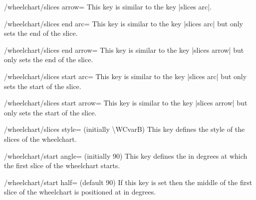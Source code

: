 \documentclass[a4paper,english,dvipsnames]{ltxdoc}
\begin{document}
\begin{key}{/wheelchart/slices arrow=}
This key is similar to the key |slices arc|.
\begin{codeexample}[width=10cm]
\begin{tikzpicture}
\wheelchart[
    gap=0.3,
    slices arrow={1}{-1}
]{\exampleforthismanual}
\end{tikzpicture}
\end{codeexample}
\end{key}
\begin{key}{/wheelchart/slices end arc=}
This key is similar to the key |slices arc| but only sets the end of the slice.
\end{key}
\begin{key}{/wheelchart/slices end arrow=}
This key is similar to the key |slices arrow| but only sets the end of the slice.
\begin{codeexample}[width=10cm]
\begin{tikzpicture}
\wheelchart[
    data={},
    explode=1,
    middle={\Large Recycle},
    slices end arrow={1}{-0.5},
    slices style=Green,
    total count=3,
    value=1
]{}
\end{tikzpicture}
\end{codeexample}
\end{key}
\begin{key}{/wheelchart/slices start arc=}
This key is similar to the key |slices arc| but only sets the start of the slice.
\end{key}
\begin{key}{/wheelchart/slices start arrow=}
This key is similar to the key |slices arrow| but only sets the start of the slice.
\end{key}
\begin{stylekey}{/wheelchart/slices style= (initially \textbackslash WCvarB)}
This key defines the style of the slices of the wheelchart.
\end{stylekey}
\begin{key}{/wheelchart/start angle= (initially 90)}
This key defines the  in degrees at which the first slice of the wheelchart starts.
\end{key}
\begin{key}{/wheelchart/start half= (default 90)}
If this key is set then the middle of the first slice of the wheelchart is positioned at  in degrees.
\end{key}
\end{document}
